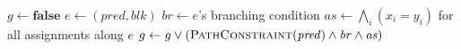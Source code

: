 \begin{algorithmic}
	\State {}
\EndIf
\State $g \gets \textbf{false}$
\State $e \gets (\mathit{pred},\mathit{blk})$
	\State $\mathit{br} \gets e$'s branching condition
	\State $\mathit{as} \gets \bigwedge_i(x_i = y_i)$ for all assignments along $e$
	\State $g \gets g \lor (\Call{PathConstraint}{\mathit{pred}} \land \mathit{br} \land \mathit{as})$
\EndIf
\EndFor
\State {}
\EndFunction
\end{algorithmic}
